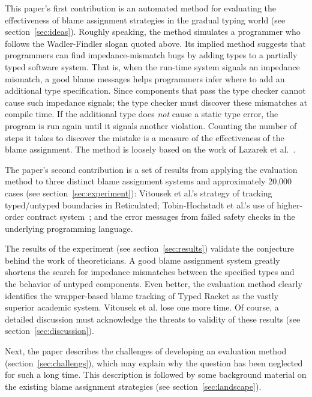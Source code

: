 This paper's first contribution is an automated method for evaluating the
effectiveness of blame assignment strategies in the gradual typing world (see
section~\ref{sec:ideas}). Roughly speaking, the method simulates a programmer who
follows the Wadler-Findler slogan quoted above. Its implied method suggests that
programmers can find impedance-mismatch bugs by adding types to a partially typed
software system. That is, when the run-time system signals an impedance mismatch,
a good blame messages helps programmers infer where to add an additional type
specification. Since components that pass the type checker cannot cause such
impedance signals; the type checker must discover these mismatches at compile
time.  If the additional type does {\em not\/} cause a static type error, the
program is run again until it signals another violation.  Counting the number of
steps it takes to discover the mistake is a measure of the effectiveness of the
blame assignment.  The method is loosely based on the work of Lazarek et
al.~\cite{lksfd-popl-2020}. 

The paper's second contribution is a set of results from applying the evaluation
method to three distinct blame assignment systems and approximately 20,000
cases (see section~\ref{sec:experiment}): Vitousek et
al.'s strategy of tracking typed/untyped boundaries in Reticulated;
Tobin-Hochstadt et al.'s use of higher-order contract system~\cite{ff-icfp-2002,
mf-toplas-2009}; and the error messages from failed safety checks in the
underlying programming language.


The results of the experiment (see section~\ref{sec:results}) validate the
conjecture behind the work of theoreticians. A good blame assignment system
greatly shortens the search for impedance mismatches between the specified types
and the behavior of untyped components. Even better, the evaluation method clearly
identifies the wrapper-based blame tracking of Typed Racket as the vastly superior
academic system. Vitousek et al. lose one more time. Of course, a detailed
discussion must acknowledge the threats to validity of these results (see
section~\ref{sec:discussion}).

Next, the paper describes the challenges of developing an evaluation method
(section~\ref{sec:challengs}), which may explain why the question has been neglected
for such a long time. This description is followed by some background material on the
existing blame assignment strategies (see section~\ref{sec:landscape}).



